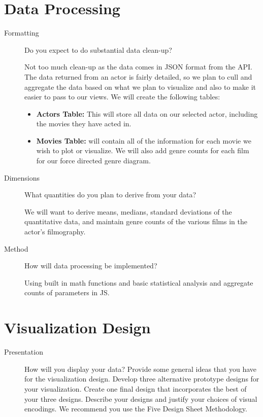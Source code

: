 \documentclass[12pt]{article}
\begin{document}
\section{Data Processing}
\begin{description}
    
    \item [Formatting] Do you expect to do substantial data clean-up?
        
        Not too much clean-up as the data comes in JSON format from the API.  The data returned from an actor is fairly detailed, so we plan to cull and aggregate the data based on what we plan to visualize and also to make it easier to pass to our views.   
        We will create the following tables:  
        \begin{itemize}
        \item \textbf{Actors Table:} This will store all data on our selected actor, including the movies they have acted in.
        \item \textbf{Movies Table:}  will contain all of the information for each movie we wish to plot or visualize.  We will also add genre counts for each film for our force directed genre diagram.
		\end{itemize}        
     

    \item [Dimensions] What quantities do you plan to derive from your data?

        We will want to derive means, medians, standard deviations of the quantitative data, and maintain genre counts of the various films in the actor's filmography.   
        

    \item [Method] How will data processing be implemented?

        Using built in math functions and basic statistical analysis and aggregate counts of parameters in JS. 

\end{description}
  
  
\section{Visualization Design}
\begin{description}
\item [Presentation]  How will you display your data? Provide some general ideas that you have for the visualization design. Develop three alternative prototype designs for your visualization. Create one final design that incorporates the best of your three designs. Describe your designs and justify your choices of visual encodings. We recommend you use the Five Design Sheet Methodology.
\end{description}
  
\end{document}
